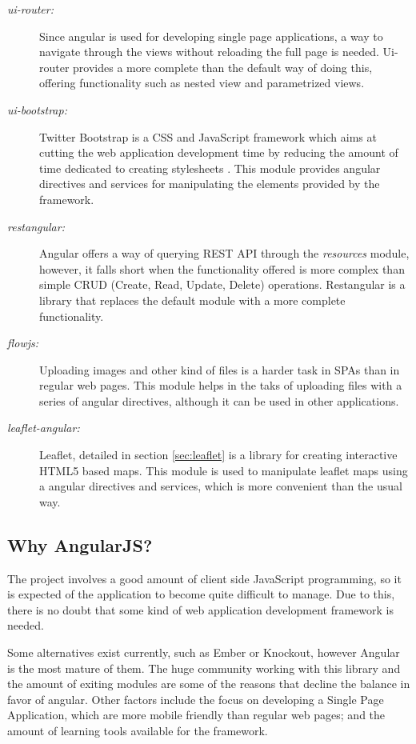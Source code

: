 \begin{description}
\item[\textit{ui-router:}] Since angular is used for developing single page applications, a way to navigate through the views without reloading the full page is needed. Ui-router provides a more complete than the default way of doing this, offering functionality such as nested view and parametrized views.

\item[\textit{ui-bootstrap:}] Twitter Bootstrap is a CSS and JavaScript framework which aims at cutting the web application development time by reducing the amount of time dedicated to creating stylesheets \cite{twbts}. This module provides angular directives and services for manipulating the elements provided by the framework.

\item[\textit{restangular:}] Angular offers a way of querying REST API through the \textit{resources} module, however, it falls short when the functionality offered is more complex than simple CRUD (Create, Read, Update, Delete) operations. Restangular is a library that replaces the default module with a more complete functionality.

\item[\textit{flowjs:}] Uploading images and other kind of files is a harder task in SPAs than in regular web pages. This module helps in the taks of uploading files with a series of angular directives, although it can be used in other applications.

\item[\textit{leaflet-angular:}] Leaflet, detailed in section \ref{sec:leaflet} is a library for creating interactive HTML5 based maps. This module is used to manipulate leaflet maps using a angular directives and services, which is more convenient than the usual way.

\end{description}

\subsection*{Why AngularJS?}

The project involves a good amount of client side JavaScript programming, so it is expected of the application to become quite difficult to manage. Due to this, there is no doubt that some kind of web application development framework is needed.

Some alternatives exist currently, such as Ember or Knockout, however Angular is the most mature of them. The huge community working with this library and the amount of exiting modules are some of the reasons that decline the balance in favor of angular. Other factors include the focus on developing a Single Page Application, which are more mobile friendly than regular web pages; and the amount of learning tools available for the framework. 

